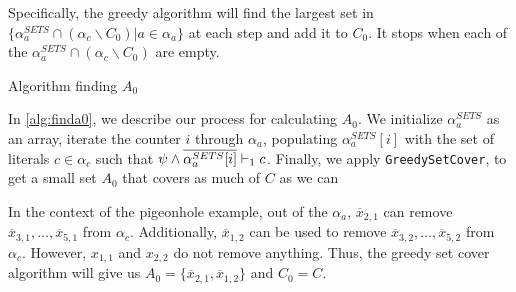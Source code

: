 Specifically, the greedy algorithm will find the largest set in $\{\alpha_a^{SETS} \cap (\alpha_c \backslash C_0) | a \in \alpha_a \}$ at each step and add it to $C_0$. It stops when each of the $\alpha_a^{SETS} \cap (\alpha_c \backslash C_0)$ are empty.


\begin{algorithm}
    \caption{Algorithm finding $A_0$}\label{alg:finda0}
    \SetAlgoNoLine
\end{algorithm}

In \autoref{alg:finda0}, we describe our process for calculating $A_0$. 
We initialize $\alpha_a^{SETS}$ as an array, iterate the counter
$i$ through $\alpha_a$, populating $\alpha_a^{SETS}[i]$ with the set of literals
$c \in \alpha_c$ such that $\psi \land \overline{\alpha_a^{SETS}[i]} \vdash_1 c$. Finally, we apply
\texttt{GreedySetCover}, to get a small set $A_0$ that covers as much of $C$ as we can

In the context of the pigeonhole example, out of the $\alpha_a$,
$\overline{x}_{2, 1}$ can remove $\overline{x}_{3, 1}, \ldots, \overline{x}_{5,
1}$ from $\alpha_c$. Additionally, $\overline{x}_{1, 2}$ can be used to remove
$\overline{x}_{3, 2}, \ldots, \overline{x}_{5, 2}$ from $\alpha_c$. However,
$x_{1, 1}$ and $x_{2, 2}$ do not remove anything. Thus, the greedy set cover
algorithm will give us $A_0 = \{\overline{x}_{2, 1}, \overline{x}_{1, 2}\}$ and
$C_0 = C$.




